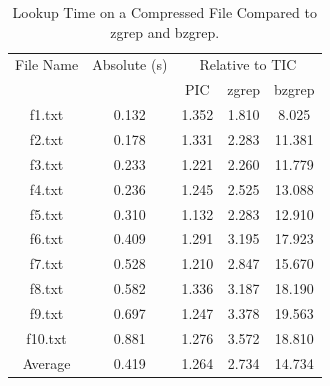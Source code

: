 \begin{table}[ht]
\centering
\begin{tabular}{ccccc}
\hline
File Name & Absolute (s) & \multicolumn{3}{c}{Relative to TIC} \\
 &  & PIC & zgrep & bzgrep \\
\hline
f1.txt & 0.132 & 1.352 & 1.810 & 8.025 \\
f2.txt & 0.178 & 1.331 & 2.283 & 11.381 \\
f3.txt & 0.233 & 1.221 & 2.260 & 11.779 \\
f4.txt & 0.236 & 1.245 & 2.525 & 13.088 \\
f5.txt & 0.310 & 1.132 & 2.283 & 12.910 \\
f6.txt & 0.409 & 1.291 & 3.195 & 17.923 \\
f7.txt & 0.528 & 1.210 & 2.847 & 15.670 \\
f8.txt & 0.582 & 1.336 & 3.187 & 18.190 \\
f9.txt & 0.697 & 1.247 & 3.378 & 19.563 \\
f10.txt & 0.881 & 1.276 & 3.572 & 18.810 \\
Average & 0.419 & 1.264 & 2.734 & 14.734 \\
\hline
\end{tabular}
\caption{Lookup Time on a Compressed File Compared to zgrep and bzgrep.}
\label{tab:lookup_streaming}
\end{table}
